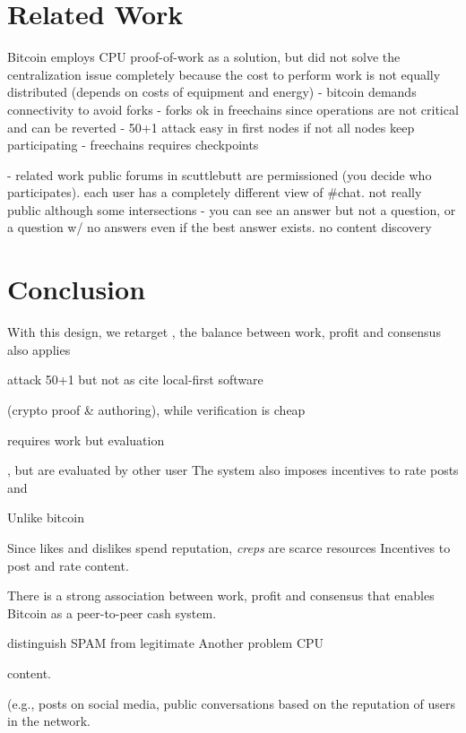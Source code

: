 \documentclass[10pt,journal,compsoc]{IEEEtran}
\begin{document}
\section{Related Work}
\label{sec.related}

Bitcoin employs CPU proof-of-work as a solution, but did not solve the
centralization issue completely because the cost to perform work is not
equally distributed
(depends on costs of equipment and energy)
    - bitcoin demands connectivity to avoid forks
    - forks ok in freechains since operations are not critical and can be reverted
    - 50+1 attack easy in first nodes if not all nodes keep participating
        - freechains requires checkpoints

- related work public forums in scuttlebutt are permissioned (you decide who
  participates). each user has a completely different view of \#chat. not really
  public although some intersections
    - you can see an answer but not a question, or a question w/ no answers
      even if the best answer exists. no content discovery



\section{Conclusion}
\label{sec.conclusion}



With this design, we retarget  , the balance between work, profit and consensus also applies 

attack 50+1 but not as
cite local-first software

 (crypto proof \& authoring),
while verification is cheap


requires work but evaluation


, but
are evaluated by other user
The system also imposes incentives to rate posts and 

Unlike bitcoin

Since likes and dislikes spend reputation, \emph{creps} are scarce resources
Incentives to post and rate content.

There is a strong association between work, profit and consensus that enables
Bitcoin as a peer-to-peer cash system.

distinguish SPAM from legitimate
Another problem CPU



content.



 (e.g., posts on social media, public conversations
based on the reputation of users
in the network.
\end{document}
